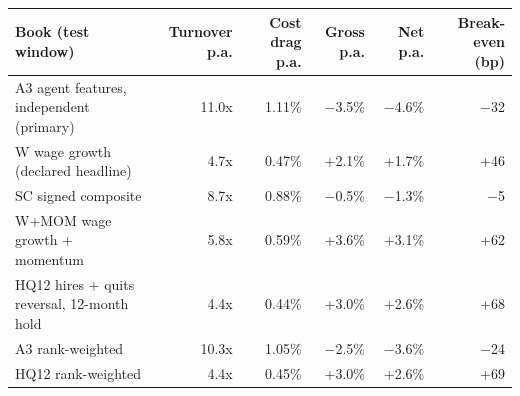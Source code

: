 \begin{tabular}{lrrrrr}
\toprule
Book (test window) & Turnover p.a. & Cost drag p.a. & Gross p.a. & Net p.a. & Break-even (bp) \\
\midrule
A3 agent features, independent (primary) & 11.0x & 1.11\% & $-$3.5\% & $-$4.6\% & $-$32 \\
W wage growth (declared headline) & 4.7x & 0.47\% & +2.1\% & +1.7\% & +46 \\
SC signed composite & 8.7x & 0.88\% & $-$0.5\% & $-$1.3\% & $-$5 \\
W+MOM wage growth + momentum & 5.8x & 0.59\% & +3.6\% & +3.1\% & +62 \\
HQ12 hires + quits reversal, 12-month hold & 4.4x & 0.44\% & +3.0\% & +2.6\% & +68 \\
A3 rank-weighted & 10.3x & 1.05\% & $-$2.5\% & $-$3.6\% & $-$24 \\
HQ12 rank-weighted & 4.4x & 0.45\% & +3.0\% & +2.6\% & +69 \\
\bottomrule
\end{tabular}
